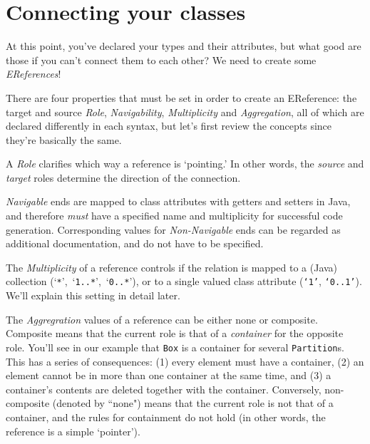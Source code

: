 \newpage
\section{Connecting your classes}
\genHeader
\hypertarget{static:references splash}{}

At this point, you've declared your types and their attributes, but what good are those if you can't connect them to each other? We need to create some
\emph{EReferences}!

There are four properties that must be set in order to create an EReference: the target and source \emph{Role}, \emph{Navigability}, \emph{Multiplicity} and \emph{Aggregation}, all of which are declared differently in each syntax, but let's first review the concepts since they're basically the same.

A \emph{Role} clarifies which way a reference is `pointing.' In other words, the \emph{source} and \emph{target} roles determine the direction of the
connection.

\emph{Navigable} ends are mapped to class attributes with getters and setters in Java, and therefore \emph{must} have a specified name and
multiplicity for successful code generation. Corresponding values for \emph{Non-Navigable} ends can  be regarded as additional documentation, and do not have
to be specified.

The \emph{Multiplicity} of a reference controls if the relation is mapped to a (Java) collection (`\texttt{*}',~`\texttt{1..*}',~`\texttt{0..*}'), or to a single
valued class attribute (\texttt{`1'}, \texttt{`0..1'}). We'll explain this setting in detail later.

The \emph{Aggregration} values of a reference can be either none or com\-po\-site. Composite means that the current role is that of a
\emph{container} for the opposite role. You'll see in our example that \texttt{Box} is a container for several \texttt{Partition}s.
This has a series of consequences: (1) every element must have a container, (2) an element cannot be in more than one container at the same time, and (3) a
container's contents are deleted together with the container. Conversely, non-composite (denoted by ``none") means that the current role is not that of a container,
and the rules for containment do not hold (in other words, the reference is a simple `pointer').



